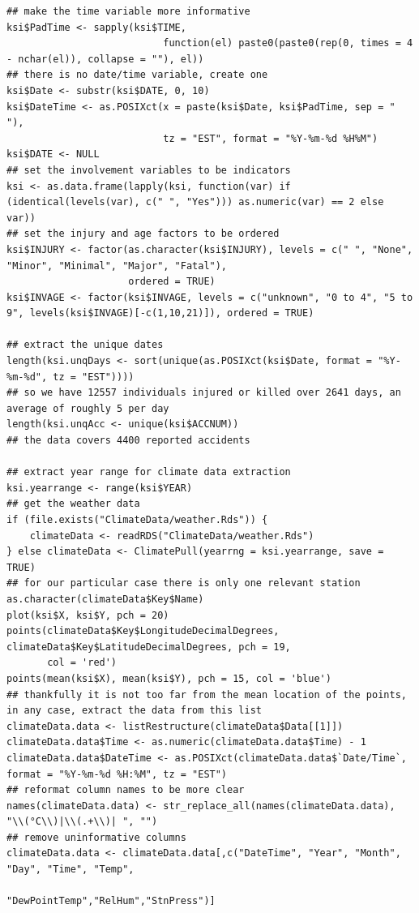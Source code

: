 \documentclass{article}
\begin{document}
\begin{lstlisting}
## make the time variable more informative
ksi$PadTime <- sapply(ksi$TIME,
                           function(el) paste0(paste0(rep(0, times = 4 - nchar(el)), collapse = ""), el))
## there is no date/time variable, create one
ksi$Date <- substr(ksi$DATE, 0, 10)
ksi$DateTime <- as.POSIXct(x = paste(ksi$Date, ksi$PadTime, sep = " "),
                           tz = "EST", format = "%Y-%m-%d %H%M")
ksi$DATE <- NULL
## set the involvement variables to be indicators
ksi <- as.data.frame(lapply(ksi, function(var) if (identical(levels(var), c(" ", "Yes"))) as.numeric(var) == 2 else var))
## set the injury and age factors to be ordered
ksi$INJURY <- factor(as.character(ksi$INJURY), levels = c(" ", "None", "Minor", "Minimal", "Major", "Fatal"),
                     ordered = TRUE)
ksi$INVAGE <- factor(ksi$INVAGE, levels = c("unknown", "0 to 4", "5 to 9", levels(ksi$INVAGE)[-c(1,10,21)]), ordered = TRUE)

## extract the unique dates
length(ksi.unqDays <- sort(unique(as.POSIXct(ksi$Date, format = "%Y-%m-%d", tz = "EST"))))
## so we have 12557 individuals injured or killed over 2641 days, an average of roughly 5 per day
length(ksi.unqAcc <- unique(ksi$ACCNUM))
## the data covers 4400 reported accidents

## extract year range for climate data extraction
ksi.yearrange <- range(ksi$YEAR)
## get the weather data
if (file.exists("ClimateData/weather.Rds")) {
    climateData <- readRDS("ClimateData/weather.Rds")
} else climateData <- ClimatePull(yearrng = ksi.yearrange, save = TRUE)
## for our particular case there is only one relevant station
as.character(climateData$Key$Name)
plot(ksi$X, ksi$Y, pch = 20)
points(climateData$Key$LongitudeDecimalDegrees, climateData$Key$LatitudeDecimalDegrees, pch = 19,
       col = 'red')
points(mean(ksi$X), mean(ksi$Y), pch = 15, col = 'blue')
## thankfully it is not too far from the mean location of the points, in any case, extract the data from this list
climateData.data <- listRestructure(climateData$Data[[1]])
climateData.data$Time <- as.numeric(climateData.data$Time) - 1
climateData.data$DateTime <- as.POSIXct(climateData.data$`Date/Time`, format = "%Y-%m-%d %H:%M", tz = "EST")
## reformat column names to be more clear
names(climateData.data) <- str_replace_all(names(climateData.data), "\\(°C\\)|\\(.+\\)| ", "")
## remove uninformative columns
climateData.data <- climateData.data[,c("DateTime", "Year", "Month", "Day", "Time", "Temp",
                                        "DewPointTemp","RelHum","StnPress")]


\end{lstlisting}
\end{document}
